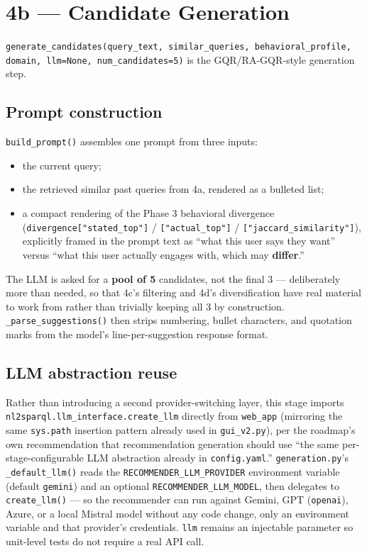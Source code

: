 \documentclass[11pt,a4paper]{article}
\newcommand{\code}[1]{\texttt{#1}}
\begin{document}
\section{4b --- Candidate Generation}

\code{generate\_candidates(query\_text, similar\_queries, behavioral\_profile, domain, llm=None,
num\_candidates=5)} is the GQR/RA-GQR-style generation step.

\subsection{Prompt construction}

\code{build\_prompt()} assembles one prompt from three inputs:

\begin{itemize}
    \item the current query;
    \item the retrieved similar past queries from 4a, rendered as a bulleted list;
    \item a compact rendering of the Phase 3 behavioral divergence
        (\code{divergence["stated\_top"]} / \code{["actual\_top"]} / \code{["jaccard\_similarity"]}),
        explicitly framed in the prompt text as ``what this user says they want'' versus ``what
        this user actually engages with, which may \textbf{differ}.''
\end{itemize}

The LLM is asked for a \textbf{pool of 5} candidates, not the final 3 --- deliberately more than
needed, so that 4c's filtering and 4d's diversification have real material to work from rather than
trivially keeping all 3 by construction. \code{\_parse\_suggestions()} then strips numbering,
bullet characters, and quotation marks from the model's line-per-suggestion response format.

\subsection{LLM abstraction reuse}

Rather than introducing a second provider-switching layer, this stage imports
\code{nl2sparql.llm\_interface.create\_llm} directly from \code{web\_app} (mirroring the same
\code{sys.path} insertion pattern already used in \code{gui\_v2.py}), per the roadmap's own
recommendation that recommendation generation should use ``the same per-stage-configurable LLM
abstraction already in \code{config.yaml}.'' \code{generation.py}'s \code{\_default\_llm()} reads
the \code{RECOMMENDER\_LLM\_PROVIDER} environment variable (default \code{gemini}) and an optional
\code{RECOMMENDER\_LLM\_MODEL}, then delegates to \code{create\_llm()} --- so the recommender can
run against Gemini, GPT (\code{openai}), Azure, or a local Mistral model without any code change,
only an environment variable and that provider's credentials. \code{llm} remains an injectable
parameter so unit-level tests do not require a real API call.
\end{document}
